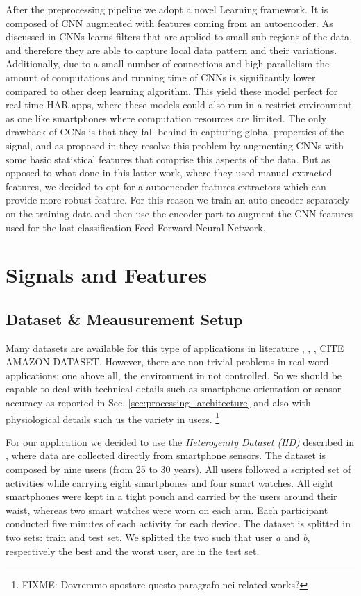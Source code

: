 After the preprocessing pipeline we adopt a novel Learning framework. It is composed of CNN augmented with features coming from an autoencoder. As discussed in \cite{ignatov2018real} CNNs learns filters that are applied to small sub-regions of the data, and therefore they are able to capture local data pattern and their variations. Additionally, due to a small number of connections and high parallelism the amount of computations and running time of CNNs is significantly lower compared to other deep learning algorithm. This yield these model perfect for real-time HAR apps, where these models could also run in a restrict environment as one like smartphones where computation resources are limited. The only drawback of CCNs is that they fall behind in capturing global properties of the signal, and as proposed in \cite{ignatov2018real} they resolve this problem by augmenting CNNs with some basic statistical features that comprise this aspects of the data. But as opposed to what done in this latter work, where they used manual extracted features, we decided to opt for a autoencoder features extractors which can provide more robust feature. For this reason we train an auto-encoder separately on the training data and then use the encoder part to augment the CNN features used for the last classification Feed Forward Neural Network.

\section{Signals and Features}
\label{sec:model}

\subsection{Dataset \& Meausurement Setup}
\label{subsec:dataset-measurement-setup}

Many datasets are available for this type of applications in
literature \cite{stisen2015smart}, \cite{anguita2013public},
\cite{blunck2013heterogeneity}, CITE AMAZON DATASET. However, there
are non-trivial problems in real-word applications: one above all, the
environment in not controlled. So we should be capable to deal with
technical details such as smartphone orientation or sensor accuracy as
reported in Sec. \ref{sec:processing_architecture} and also with
physiological details such us the variety in users. \footnote{FIXME:
  Dovremmo spostare questo paragrafo nei related works?}

For our application we decided to use the \textit{Heterogenity Dataset (HD)} described in
\cite{blunck2013heterogeneity}, where data are collected directly from
smartphone sensors. The dataset is composed by nine users (from 25 to
30 years). All users followed a scripted set of activities while
carrying eight smartphones and four smart watches. All eight
smartphones were kept in a tight pouch and carried by the users around
their waist, whereas two smart watches were worn on each arm. Each
participant conducted five minutes of each activity for each device.
The dataset is splitted in two sets: train and test set. We splitted
the two such that user \textit{a} and \textit{b}, respectively the
best and the worst user, are in the test set.


